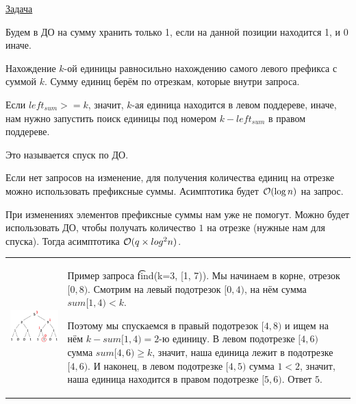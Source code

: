  \href{https://codeforces.com/edu/course/2/lesson/4/2/practice/contest/273278/problem/B}{Задача}

Будем в ДО на сумму хранить только 1, если на данной позиции находится 1, и 0 иначе.
\down

Нахождение $k$-ой единицы равносильно нахождению самого левого префикса с суммой $k$. Сумму единиц берём по отрезкам, которые внутри запроса.

Если $left_{sum} >= k$, значит, $k$-ая единица находится в левом поддереве, иначе, нам нужно запустить поиск единицы под номером $k - left_{sum}$ в правом поддереве.

Это называется спуск по ДО.

\down

Если нет запросов на изменение, для получения количества единиц на отрезке можно использовать префиксные суммы. 
Асимптотика будет $ \mathcal{O}(\log n)$ на запрос.

При изменениях элементов префиксные суммы нам уже не помогут. Можно будет использовать ДО, чтобы получать количество $1$ на отрезке (нужные нам для спуска). Тогда асимптотика $ \mathcal{O}(q \times log^2 n)$. 

\begin{tabular}{cm{}}
	\begin{minipage}{4cm}
		\includegraphics[scale=0.5]{files/k-th.png}
	\end{minipage} 
	&
	Пример запроса \t{find(k=3, [1, 7))}. Мы начинаем в корне, отрезок $[0,8)$. Смотрим на левый подотрезок $[0, 4)$, на нём сумма $sum [1,4) < k$. 
	
	Поэтому мы спускаемся в правый подотрезок $[4,8)$ и ищем на нём $k-sum [1, 4) = 2$-ю единицу. В левом подотрезке $[4,6)$ сумма $sum [4, 6) \ge k$, значит, наша единица лежит в подотрезке $[4,6)$. И наконец, в левом подотрезке $[4,5)$ сумма $1 < 2$, значит, наша единица находится в правом подотрезке $[5,6)$. Ответ $5$.
\end{tabular}

